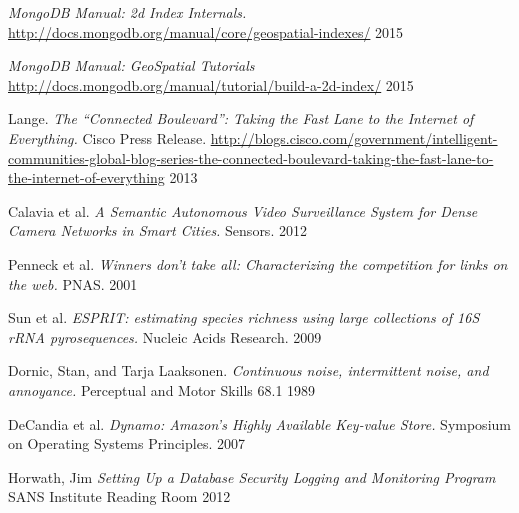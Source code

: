 \documentclass[11pt]{article}
\begin{document}
\begin{thebibliography}{99}
  \emph{MongoDB Manual: 2d Index Internals.}
  \url{http://docs.mongodb.org/manual/core/geospatial-indexes/}
  2015


  \emph{MongoDB Manual: GeoSpatial Tutorials}
  \url{http://docs.mongodb.org/manual/tutorial/build-a-2d-index/}
  2015

  Lange.
  \emph{The ``Connected Boulevard'': Taking the Fast Lane to the Internet of Everything.}
  Cisco Press Release.
  \url{http://blogs.cisco.com/government/intelligent-communities-global-blog-series-the-connected-boulevard-taking-the-fast-lane-to-the-internet-of-everything}
  2013

  Calavia et al.
  \emph{A Semantic Autonomous Video Surveillance System for Dense Camera Networks in Smart Cities.}
  Sensors.
  2012

  Penneck et al.
  \emph{Winners don't take all: Characterizing the competition for links on the web.}
  PNAS.
  2001

  Sun et al.
  \emph{ESPRIT: estimating species richness using large collections of 16S rRNA pyrosequences.}
  Nucleic Acids Research.
  2009

Dornic, Stan, and Tarja Laaksonen. 
\emph{Continuous noise, intermittent noise, and annoyance.} 
Perceptual and Motor Skills 68.1
1989

  DeCandia et al.
  \emph{Dynamo: Amazon’s Highly Available Key-value Store.}
  Symposium on Operating Systems Principles.
  2007

Horwath, Jim
\emph{Setting Up a Database Security Logging and Monitoring Program}
SANS Institute Reading Room
2012

\end{thebibliography}
\end{document}

